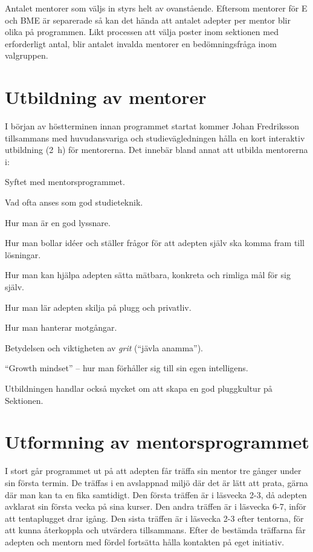 \documentclass[10pt]{article}
\begin{document}
    Antalet mentorer som väljs in styrs helt av ovanstående.
    Eftersom mentorer för E och BME är separerade så kan det hända att antalet adepter per mentor blir olika på programmen.
    Likt processen att välja poster inom sektionen med erforderligt antal, blir antalet invalda mentorer en bedömningsfråga inom valgruppen.

    \newpage

    \section{Utbildning av mentorer}
    I början av höstterminen innan programmet startat kommer Johan Fredriksson tillsammans med huvudansvariga och studievägledningen hålla en kort interaktiv utbildning (\SI{2}{h}) för mentorerna.
    Det innebär bland annat att utbilda mentorerna i:
    \begin{dashlist}
        \item Syftet med mentorsprogrammet.
        \item Vad ofta anses som god studieteknik.
        \item Hur man är en god lyssnare.
        \item Hur man bollar idéer och ställer frågor för att adepten själv ska komma fram till lösningar.
        \item Hur man kan hjälpa adepten sätta mätbara, konkreta och rimliga  mål för sig själv.
        \item Hur man lär adepten skilja på plugg och privatliv.
        \item Hur man hanterar motgångar.
        \item Betydelsen och viktigheten av \emph{grit} (``jävla anamma'').
        \item ``Growth mindset'' -- hur man förhåller sig till sin egen intelligens.
    \end{dashlist}
    Utbildningen handlar också mycket om att skapa en god pluggkultur på Sektionen.

    \section{Utformning av mentorsprogrammet}
    I stort går programmet ut på att adepten får träffa sin mentor tre gånger under sin första termin.
    De träffas i en avslappnad miljö där det är lätt att prata, gärna där man kan ta en fika samtidigt.
    Den första träffen är i läsvecka 2-3, då adepten avklarat sin första vecka på sina kurser.
    Den andra träffen är i läsvecka 6-7, inför att tentaplugget drar igång.
    Den sista träffen är i läsvecka 2-3 efter tentorna, för att kunna återkoppla och utvärdera tillsammans.
    Efter de bestämda träffarna får adepten och mentorn med fördel fortsätta hålla kontakten på eget initiativ.
\end{document}
